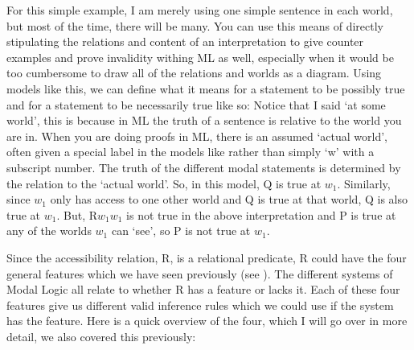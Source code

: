 For this simple example, I am merely using one simple sentence in each world, but most of the time, there will be many. You can use this means of directly stipulating the relations and content of an interpretation to give counter examples and prove invalidity withing ML as well, especially when it would be too cumbersome to draw all of the relations and worlds as a diagram. Using models like this, we can define what it means for a statement to be possibly true and for a statement to be necessarily true like so:
Notice that I said `at some world', this is because in ML the truth of a sentence is relative to the world you are in. When you are doing proofs in ML, there is an assumed `actual world', often given a special label in the models like  rather than simply `w' with a subscript number. The truth of the different modal statements is determined by the relation to the `actual world'. So, in this model, \ediamond Q is true at $w_1$. Similarly, since $w_1$ only has access to one other world and Q is true at that world, \ebox Q is also true at $w_1$. But, R$w_1$$w_1$ is not true in the above interpretation and P is true at any of the worlds $w_1$ can `see', so \ediamond P is not true at $w_1$.

Since the accessibility relation, R, is a relational predicate, R could have the four general features which we have seen previously (see ). The different systems of Modal Logic all relate to whether R has a feature or lacks it.  Each of these four features give us different valid inference rules which we could use if the system has the feature. Here is a quick overview of the four, which I will go over in more detail, we also covered this previously:

